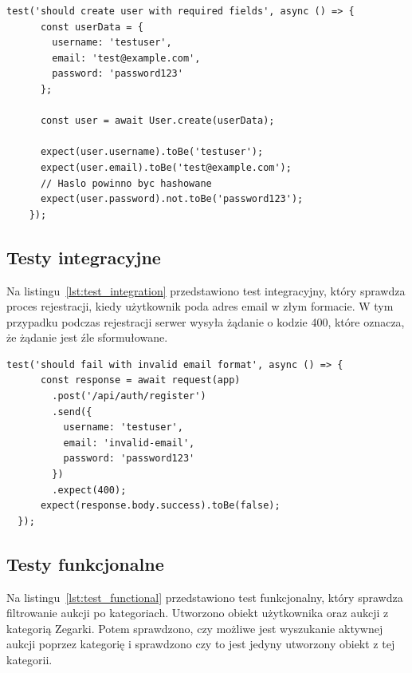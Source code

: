 \begin{lstlisting}[style=javascript, caption = {Test jednostkowy utworzenia instancji modelu User}, label = {lst:unit_test}]
 test('should create user with required fields', async () => {
      const userData = {
        username: 'testuser',
        email: 'test@example.com',
        password: 'password123'
      };

      const user = await User.create(userData);

      expect(user.username).toBe('testuser');
      expect(user.email).toBe('test@example.com');
      // Haslo powinno byc hashowane
      expect(user.password).not.toBe('password123'); 
    });
\end{lstlisting}

\subsection{Testy integracyjne}
Na listingu~\ref{lst:test_integration} przedstawiono test integracyjny, który sprawdza proces rejestracji, kiedy użytkownik poda adres email w złym formacie. W tym przypadku podczas rejestracji serwer wysyła żądanie o kodzie 400, które oznacza, że żądanie jest źle sformułowane.

\begin{lstlisting}[style=javascript, caption = {Test integracyjny rejestracji ze złym adresem email}, label = {lst:test_integration}]
 test('should fail with invalid email format', async () => {
      const response = await request(app)
        .post('/api/auth/register')
        .send({
          username: 'testuser',
          email: 'invalid-email',
          password: 'password123'
        })
        .expect(400);
      expect(response.body.success).toBe(false);
  });
\end{lstlisting}
\subsection{Testy funkcjonalne}
Na listingu~\ref{lst:test_functional} przedstawiono test funkcjonalny, który sprawdza filtrowanie aukcji po kategoriach. Utworzono obiekt użytkownika oraz aukcji z kategorią Zegarki. Potem sprawdzono, czy możliwe jest wyszukanie aktywnej aukcji poprzez kategorię i sprawdzono czy to jest jedyny utworzony obiekt z tej kategorii.

